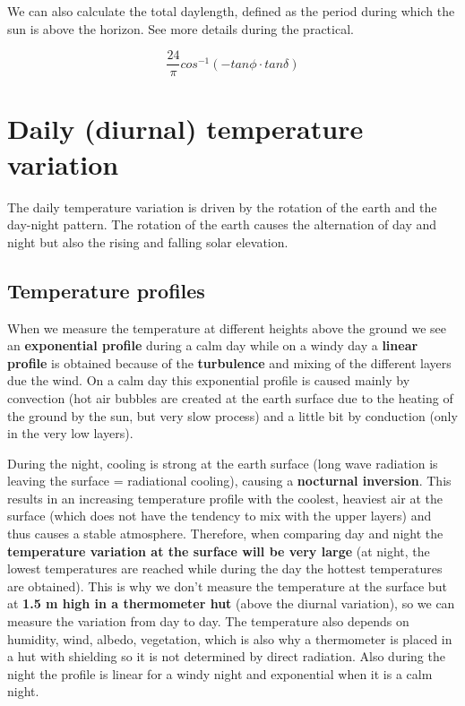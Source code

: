 \documentclass[oneside]{book}
\begin{document}
We can also calculate the total daylength, defined as the period during
which the sun is above the horizon. See more details during the
practical.

\begin{equation} 
   \frac{24}{\pi} cos^{-1}\left(-tan\phi \cdot tan \delta \right)
   \label{eq:Eqdaylength}
\end{equation}

\section{Daily (diurnal) temperature
variation}\label{daily-diurnal-temperature-variation}

The daily temperature variation is driven by the rotation of the earth
and the day-night pattern. The rotation of the earth causes the
alternation of day and night but also the rising and falling solar
elevation.

\subsection{Temperature profiles}\label{temperature-profiles}

When we measure the temperature at different heights above the ground we
see an \textbf{exponential profile} during a calm day while on a windy
day a \textbf{linear profile} is obtained because of the
\textbf{turbulence} and mixing of the different layers due the wind. On
a calm day this exponential profile is caused mainly by convection (hot
air bubbles are created at the earth surface due to the heating of the
ground by the sun, but very slow process) and a little bit by conduction
(only in the very low layers).

During the night, cooling is strong at the earth surface (long wave
radiation is leaving the surface = radiational cooling), causing a
\textbf{nocturnal inversion}. This results in an increasing temperature
profile with the coolest, heaviest air at the surface (which does not
have the tendency to mix with the upper layers) and thus causes a stable
atmosphere. Therefore, when comparing day and night the
\textbf{temperature variation at the surface will be very large} (at
night, the lowest temperatures are reached while during the day the
hottest temperatures are obtained). This is why we don't measure the
temperature at the surface but at \textbf{1.5 m high in a thermometer
hut} (above the diurnal variation), so we can measure the variation from
day to day. The temperature also depends on humidity, wind, albedo,
vegetation, which is also why a thermometer is placed in a hut with
shielding so it is not determined by direct radiation. Also during the
night the profile is linear for a windy night and exponential when it is
a calm night.
\end{document}
